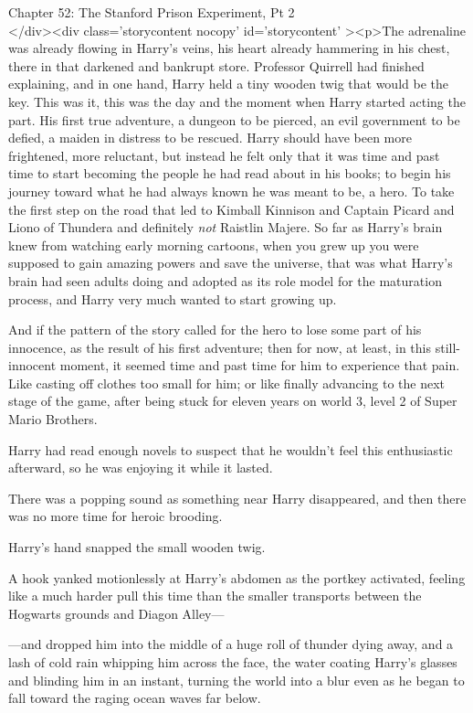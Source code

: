 
Chapter 52: The Stanford Prison Experiment, Pt 2\\
</div><div  class='storycontent nocopy' id='storycontent' ><p>The adrenaline 
was already flowing in Harry's veins, his heart already hammering in his chest, 
there in that darkened and bankrupt store. Professor Quirrell had finished 
explaining, and in one hand, Harry held a tiny wooden twig that would be the 
key. This was it, this was the day and the moment when Harry started acting the 
part. His first true adventure, a dungeon to be pierced, an evil government to 
be defied, a maiden in distress to be rescued. Harry should have been more 
frightened, more reluctant, but instead he felt only that it was time and past 
time to start becoming the people he had read about in his books; to begin his 
journey toward what he had always known he was meant to be, a hero. To take the 
first step on the road that led to Kimball Kinnison and Captain Picard and 
Liono of Thundera and definitely \emph{not} Raistlin Majere. So far as Harry's 
brain knew from watching early morning cartoons, when you grew up you were 
supposed to gain amazing powers and save the universe, that was what Harry's 
brain had seen adults doing and adopted as its role model for the maturation 
process, and Harry very much wanted to start growing up.

And if the pattern of the story called for the hero to lose some part of his 
innocence, as the result of his first adventure; then for now, at least, in 
this still-innocent moment, it seemed time and past time for him to experience 
that pain. Like casting off clothes too small for him; or like finally 
advancing to the next stage of the game, after being stuck for eleven years on 
world 3, level 2 of Super Mario Brothers.

Harry had read enough novels to suspect that he wouldn't feel this enthusiastic 
afterward, so he was enjoying it while it lasted.

There was a popping sound as something near Harry disappeared, and then there 
was no more time for heroic brooding.

Harry's hand snapped the small wooden twig.

A hook yanked motionlessly at Harry's abdomen as the portkey activated, feeling 
like a much harder pull this time than the smaller transports between the 
Hogwarts grounds and Diagon Alley---

---and dropped him into the middle of a huge roll of thunder dying away, and a 
lash of cold rain whipping him across the face, the water coating Harry's 
glasses and blinding him in an instant, turning the world into a blur even as 
he began to fall toward the raging ocean waves far below.

